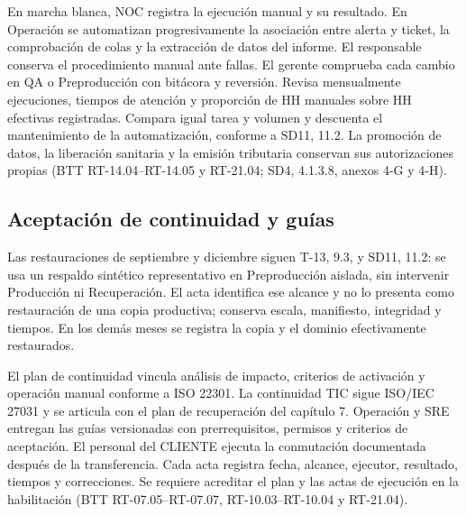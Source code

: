 En marcha blanca, NOC registra la ejecución manual y su resultado. En Operación se automatizan progresivamente la asociación entre alerta y ticket, la comprobación de colas y la extracción de datos del informe. El responsable conserva el procedimiento manual ante fallas. El gerente comprueba cada cambio en QA o Preproducción con bitácora y reversión. Revisa mensualmente ejecuciones, tiempos de atención y proporción de HH manuales sobre HH efectivas registradas. Compara igual tarea y volumen y descuenta el mantenimiento de la automatización, conforme a SD11, 11.2. La promoción de datos, la liberación sanitaria y la emisión tributaria conservan sus autorizaciones propias (BTT RT-14.04--RT-14.05 y RT-21.04; SD4, 4.1.3.8, anexos 4-G y 4-H).

\subsection*{Aceptación de continuidad y guías}
Las restauraciones de septiembre y diciembre siguen T-13, 9.3, y SD11, 11.2: se usa un respaldo sintético representativo en Preproducción aislada, sin intervenir Producción ni Recuperación. El acta identifica ese alcance y no lo presenta como restauración de una copia productiva; conserva escala, manifiesto, integridad y tiempos. En los demás meses se registra la copia y el dominio efectivamente restaurados.

El plan de continuidad vincula análisis de impacto, criterios de activación y operación manual conforme a ISO 22301. La continuidad TIC sigue ISO/IEC 27031 y se articula con el plan de recuperación del capítulo 7. Operación y SRE entregan las guías versionadas con prerrequisitos, permisos y criterios de aceptación. El personal del CLIENTE ejecuta la conmutación documentada después de la transferencia. Cada acta registra fecha, alcance, ejecutor, resultado, tiempos y correcciones. Se requiere acreditar el plan y las actas de ejecución en la habilitación (BTT RT-07.05--RT-07.07, RT-10.03--RT-10.04 y RT-21.04).

